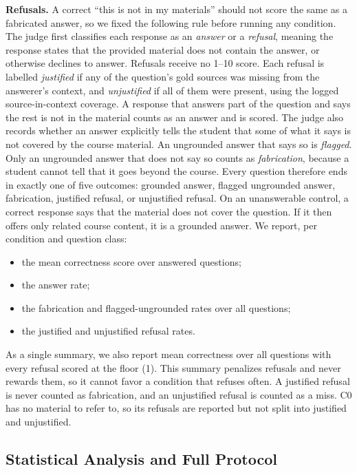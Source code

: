 \documentclass[letterpaper]{article} %
\begin{document}
\textbf{Refusals.} A correct ``this is not in my materials'' should not score the same as a fabricated answer, so we fixed the following rule before running any condition. The judge first classifies each response as an \emph{answer} or a \emph{refusal}, meaning the response states that the provided material does not contain the answer, or otherwise declines to answer. Refusals receive no 1--10 score. Each refusal is labelled \emph{justified} if any of the question's gold sources was missing from the answerer's context, and \emph{unjustified} if all of them were present, using the logged source-in-context coverage. A response that answers part of the question and says the rest is not in the material counts as an answer and is scored. The judge also records whether an answer explicitly tells the student that some of what it says is not covered by the course material. An ungrounded answer that says so is \emph{flagged}. Only an ungrounded answer that does not say so counts as \emph{fabrication}, because a student cannot tell that it goes beyond the course. Every question therefore ends in exactly one of five outcomes: grounded answer, flagged ungrounded answer, fabrication, justified refusal, or unjustified refusal. On an unanswerable control, a correct response says that the material does not cover the question. If it then offers only related course content, it is a grounded answer. We report, per condition and question class:
\begin{itemize}
\item the mean correctness score over answered questions;
\item the answer rate;
\item the fabrication and flagged-ungrounded rates over all questions;
\item the justified and unjustified refusal rates.
\end{itemize}
As a single summary, we also report mean correctness over all questions with every refusal scored at the floor (1). This summary penalizes refusals and never rewards them, so it cannot favor a condition that refuses often. A justified refusal is never counted as fabrication, and an unjustified refusal is counted as a miss. C0 has no material to refer to, so its refusals are reported but not split into justified and unjustified.

\subsection{Statistical Analysis and Full Protocol}
\end{document}
